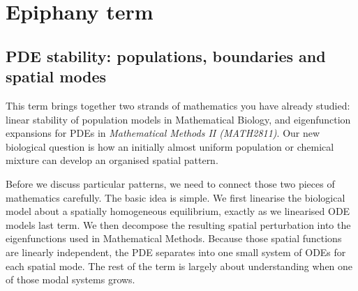 \documentclass[main.tex]{subfiles}
\begin{document}
\part{Epiphany term}

\chapter{PDE stability: populations, boundaries and spatial modes}
\label{merged:pde}
This term brings together two strands of mathematics you have already studied: linear stability of population models in Mathematical Biology, and eigenfunction expansions for PDEs in \emph{Mathematical Methods II (MATH2811)}. Our new biological question is how an initially almost uniform population or chemical mixture can develop an organised spatial pattern.

Before we discuss particular patterns, we need to connect those two pieces of mathematics carefully. The basic idea is simple. We first linearise the biological model about a spatially homogeneous equilibrium, exactly as we linearised ODE models last term. We then decompose the resulting spatial perturbation into the eigenfunctions used in Mathematical Methods. Because those spatial functions are linearly independent, the PDE separates into one small system of ODEs for each spatial mode. The rest of the term is largely about understanding when one of those modal systems grows.
\end{document}
